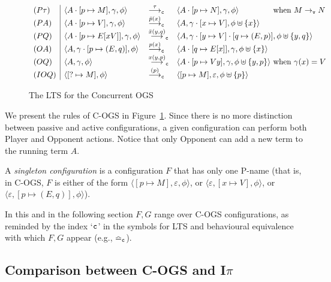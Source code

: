 \documentclass[11pt,a4paper]{amsart}
\theoremstyle{plain}
\theoremstyle{definition}
\theoremstyle{defC}
\theoremstyle{thmC}
\theoremstyle{plain}
\numberwithin{equation}{section}
\newcommand{\COGS}{\mbox{{\rm C-OGS}}\xspace}      %
\newcommand{\rmm}[1]{{\tt{\lowercase{#1}}}}
\newcommand{\genarr}[2]{\mathrel{\stackrel{{#1}}{\longrightarrow}_{\rmm{\lowercase{#2}}}}}
\newcommand{\arrC}[1]{\genarr{#1}{C}}   %
\newcommand{\genTE}[1]{\mathrel{\bumpeq_{\rmm{\lowercase{#1}}}}}       %
\newcommand{\FF}{F}
\newcommand{\GG}{G}
\newcommand{\Intp}{\mbox{I$\pi$}\xspace}   %
\newcommand{\piI}{\Intp}   %
\newcommand{\emptymap}{\varepsilon}
\newcommand{\pmap}[2]{[#1 \mapsto #2]}
\newcommand{\redv}{\rightarrow_{\tt{v}}}
\newcommand{\ansP}[2]{\bar{#1}(#2)}
\newcommand{\questPV}[3]{\bar{#1}(#2,#3)}
\newcommand{\ansO}[2]{#1(#2)}
\newcommand{\questOV}[3]{#1(#2,#3)}
\newcommand{\questOinit}[1]{(#1)}
\newcommand{\conf}[1]{\langle #1\rangle}
\newcommand{\initconf}[2]{\langle[? \mapsto #2], #1\rangle}
\theoremstyle{plain}
\theoremstyle{definition}
\begin{document}
\begin{figure}
 \[\begin{array}{l|lll@{}l}
   (P\tau) & \conf{A \cdot \pmap{p}{M},\gamma,\phi} & \arrC{\ \tau \ } & 
     \conf{A \cdot \pmap{p}{N},\gamma,\phi} & \text{ when } M \redv N\\
%
   (PA) & \conf{A \cdot \pmap{p}{V},\gamma,\phi} & \arrC{\ansP{p}{x}} & 
     \conf{A,\gamma \cdot \pmap{x}{V},\phi \uplus \{x\}} \\
%
   (PQ) & \conf{A \cdot \pmap{p}{E[xV]},\gamma,\phi} & \arrC{\questPV{x}{y}{q}} & 
     \multicolumn{2}{l}{\conf{A,\gamma \cdot \pmap{y}{V} \cdot \pmap{q}{(E,p)},
     \phi \uplus \{y,q\}}} \\
%
   (OA) & \conf{A,\gamma\cdot\pmap{p}{(E,q)},\phi} & \arrC{\ansO{p}{x}} & 
     \conf{A \cdot \pmap{q}{E[x]},\gamma,\phi \uplus \{x\}} \\
%
   (OQ) & \conf{A,\gamma,\phi} & \arrC{\questOV{x}{y}{p}} & 
     \conf{A \cdot \pmap{p}{V y},\gamma,\phi \uplus \{y,p\}} 
     & \text{ when } \gamma(x) = V\\
   (IOQ) & \initconf{\phi}{M} & \arrC{\questOinit{p}} &
     \conf{\pmap{p}{M},\emptymap,\phi \uplus \{p\}}
  \end{array}\]
\caption{The LTS for the Concurrent OGS}
\label{fig:conc-ogs-lts}
\end{figure}
 
We present the rules of \COGS in Figure~\ref{fig:conc-ogs-lts}.
Since there is no more distinction between passive and active configurations,
a given configuration can perform both %
Player and Opponent actions.
Notice that only Opponent can add a new term to the running term $A$.

A  \emph{singleton configuration} is a configuration $\FF$
that has only one P-name (that is, in \COGS,  $\FF$ is either of the form 
$\conf{\pmap{p}{M},\emptymap,\phi}$, or  
$\conf{\emptymap,\pmap{x}{V},\phi}$, or $\conf{\emptymap,\pmap{p}{(E,q)},\phi}$).

In this and in the following section $\FF,\GG$ range over \COGS configurations, as reminded
by the index `$\rmm{C}$'
  in the symbols for LTS and behavioural equivalence with  which $\FF,\GG$ appear (e.g.,
  $\genTE C$).


\subsection{Comparison between \COGS and \piI}
\label{ss:compa_cogs_piI}
\end{document}
